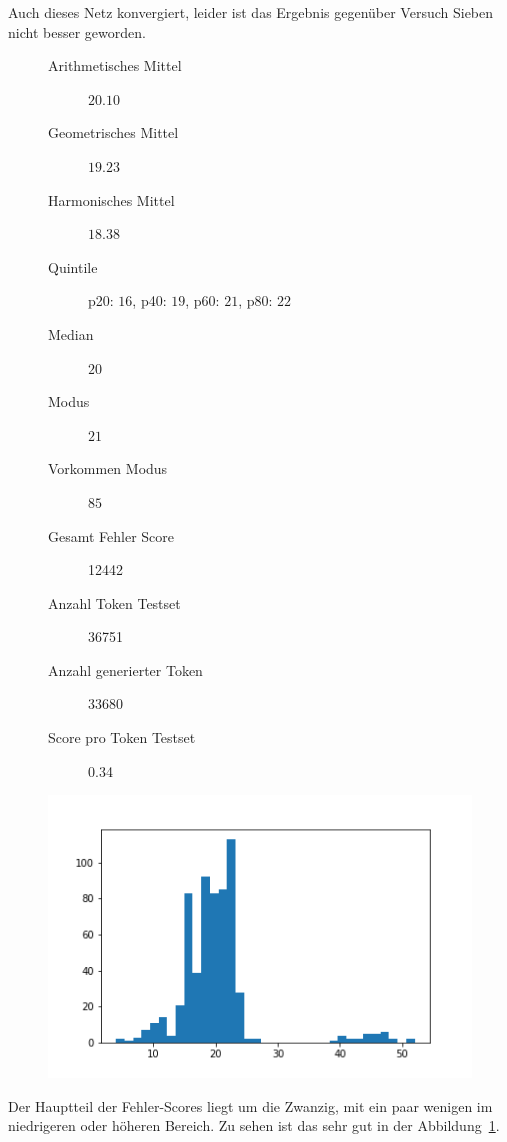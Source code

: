 \documentclass[pdftex,a4paper,halfparskip, article]{scrartcl}
\begin{document}
Auch dieses Netz konvergiert, leider ist das Ergebnis gegenüber Versuch Sieben nicht besser geworden.

\begin{figure}
\centering
\begin{minipage}{.5\textwidth}
  \centering
  \begin{description}
	\item[Arithmetisches Mittel] $20.10$	
	\item[Geometrisches Mittel] $19.23$
	\item[Harmonisches Mittel] $18.38$
	\item[Quintile] p20: $16$, p40: $19$, p60: $21$, p80: $22$
	\item[Median] $20$
	\item[Modus] $21$
	\item[Vorkommen Modus] $85$
	\item[Gesamt Fehler Score] 12442
	\item[Anzahl Token Testset] 36751 
	\item[Anzahl generierter Token] 33680
	\item[Score pro Token Testset]  0.34
\end{description}
  \label{fig:lage_bin14}
\end{minipage}%
\begin{minipage}{.5\textwidth}
  \centering
  \includegraphics[width=1\linewidth]{predictions_bin14_histogramm}
  \label{fig:hist_bin14}
\end{minipage}
\end{figure}

Der Hauptteil der Fehler-Scores liegt um die Zwanzig, mit ein paar wenigen im niedrigeren oder höheren Bereich. Zu sehen ist das sehr gut in der Abbildung~\ref{fig:hist_bin14}. 
\end{document}
